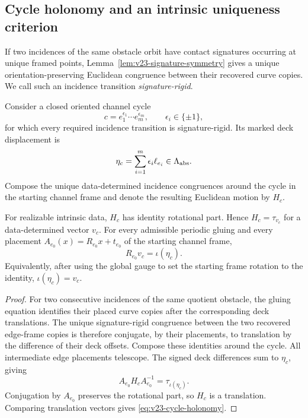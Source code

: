 \subsection{Cycle holonomy and an intrinsic uniqueness criterion}

If two incidences of the same obstacle orbit have contact signatures occurring
at unique framed points, Lemma~\ref{lem:v23-signature-symmetry} gives a unique
orientation-preserving Euclidean congruence between their recovered curve
copies.  We call such an incidence transition \emph{signature-rigid}.

Consider a closed oriented channel cycle
\[
 c=e_1^{\epsilon_1}\cdots e_m^{\epsilon_m},
 \qquad \epsilon_i\in\{\pm1\},
\]
for which every required incidence transition is signature-rigid.  Its marked
deck displacement is
\begin{equation}\label{eq:v23-cycle-deck}
 \eta_c=\sum_{i=1}^m\epsilon_i\ell_{e_i}
 \in\Lambda_{\rm abs}.
\end{equation}
Compose the unique data-determined incidence congruences around the cycle in
the starting channel frame and denote the resulting Euclidean motion by
\(H_c\).

\begin{lemma}
\label{lem:v23-cycle-holonomy}
For realizable intrinsic data, \(H_c\) has identity rotational part.  Hence
\(H_c=\tau_{v_c}\) for a data-determined vector \(v_c\).  For every admissible
periodic gluing and every placement \(A_{e_0}(x)=R_{e_0}x+t_{e_0}\) of the
starting channel frame,
\begin{equation}\label{eq:v23-cycle-holonomy}
                         R_{e_0}v_c=\iota(\eta_c).
\end{equation}
Equivalently, after using the global gauge to set the starting frame rotation
to the identity, \(\iota(\eta_c)=v_c\).
\end{lemma}

\begin{proof}
For two consecutive incidences of the same quotient obstacle, the gluing
equation identifies their placed curve copies after the corresponding deck
translations.  The unique signature-rigid congruence between the two recovered
edge-frame copies is therefore conjugate, by their placements, to translation
by the difference of their deck offsets.  Compose these identities around the
cycle.  All intermediate edge placements telescope.  The signed deck
differences sum to \(\eta_c\), giving
\[
 A_{e_0}H_cA_{e_0}^{-1}
 =\tau_{\iota(\eta_c)}.
\]
Conjugation by \(A_{e_0}\) preserves the rotational part, so \(H_c\) is a
translation.  Comparing translation vectors gives
\eqref{eq:v23-cycle-holonomy}.
\end{proof}

